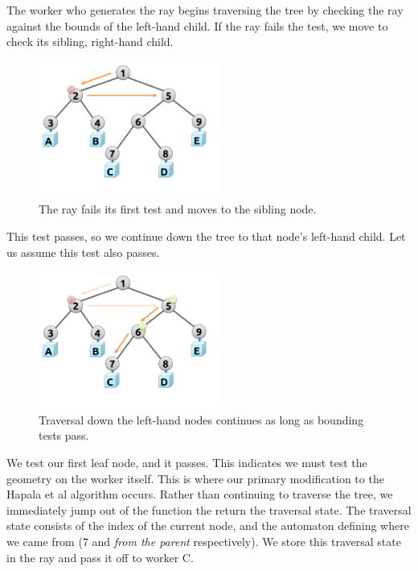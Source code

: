 \documentclass[a4paper,twoside]{article}
\begin{document}
The worker who generates the ray begins traversing the tree by checking the ray
against the bounds of the left-hand child. If the ray fails the test, we move
to check its sibling, right-hand child.

\begin{figure}[h!]
    \centering
    \includegraphics[width=60mm]{figures/traversal2.pdf}

    \caption{The ray fails its first test and moves to the sibling node.}
    \label{fig:traversal2}
\end{figure}

This test passes, so we continue down the tree to that node's left-hand child.
Let us assume this test also passes.

\begin{figure}[h!]
    \centering
    \includegraphics[width=60mm]{figures/traversal3.pdf}

    \caption{Traversal down the left-hand nodes continues as long as bounding tests pass.}
    \label{fig:traversal3}
\end{figure}

We test our first leaf node, and it passes. This indicates we must test the
geometry on the worker itself. This is where our primary modification to the
Hapala et al \cite{hapala:2011} algorithm occurs. Rather than continuing to
traverse the tree, we immediately jump out of the function the return the
traversal state. The traversal state consists of the index of the current
node, and the automaton defining where we came from (7 and \emph{from the parent}
respectively). We store this traversal state in the ray and pass it off to worker
C.
\end{document}
